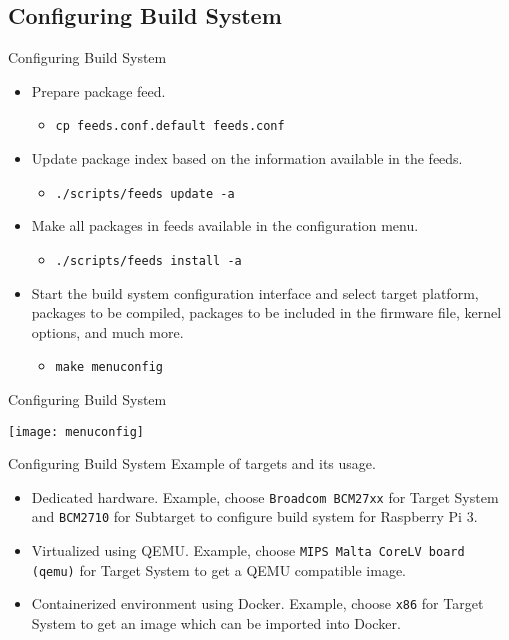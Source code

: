 \subsection{Configuring Build System}
\begin{frame}{Configuring Build System}
    \pause
    \begin{itemize}[<+-|alert@+>]
        \item Prepare package feed.
        \begin{itemize}
            \item \texttt{cp feeds.conf.default feeds.conf}
        \end{itemize}
        \item Update package index based on the information available in the feeds.
        \begin{itemize}
            \item \texttt{./scripts/feeds update -a}
        \end{itemize}
        \item Make all packages in feeds available in the configuration menu.
        \begin{itemize}
            \item \texttt{./scripts/feeds install -a}
        \end{itemize}
        \item Start the build system configuration interface and select target platform, packages to be compiled, packages to be included in the firmware file, kernel options, and much more.
        \begin{itemize}
            \item \texttt{make menuconfig}
        \end{itemize}
    \end{itemize}
\end{frame}

\begin{frame}{Configuring Build System}
    \centerline{\texttt{[image: menuconfig]}}
\end{frame}

\begin{frame}{Configuring Build System}
    Example of targets and its usage.
    \pause
    \begin{itemize}[<+-|alert@+>]
        \item Dedicated hardware. Example, choose \texttt{Broadcom BCM27xx} for Target System and \texttt{BCM2710} for Subtarget to configure build system for Raspberry Pi 3.
        \item Virtualized using QEMU. Example, choose \texttt{MIPS Malta CoreLV board (qemu)} for Target System to get a QEMU compatible image.
        \item Containerized environment using Docker. Example, choose \texttt{x86} for Target System to get an image which can be imported into Docker.
    \end{itemize}
\end{frame}

